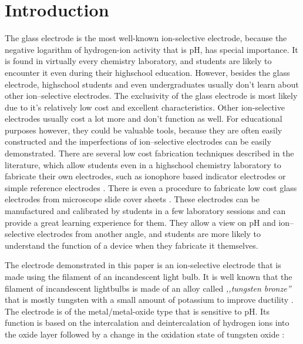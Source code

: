 \documentclass[manuscript=article, journal=jceda8]{achemso}
\begin{document}
\section{Introduction}

The glass electrode is the most well-known ion-selective electrode, because the negative logarithm of hydrogen-ion activity that is pH, has special importance. 
It is found in virtually every chemistry laboratory, and students are likely to encounter it even during their highschool education. However, besides the glass electrode, highschool students and even undergraduates usually don't learn about other ion--selective electrodes. 
The exclusivity of the glass electrode is most likely due to it's relatively low cost and excellent characteristics. Other ion-selective electrodes usually cost a lot more and don't function as well. For educational purposes however, they could be valuable tools, because they are often easily constructed and the imperfections of ion--selective electrodes can be easily demonstrated. There are several low cost fabrication techniques described in the literature, which allow students even in a highschool chemistry laboratory to fabricate their own electrodes, such as ionophore based indicator electrodes \cite{goldcamp2010inexpensive, marafie2007plastic} or simple reference electrodes \cite{riyazuddin1994low}. There is even a procedure to fabricate low cost glass electrodes from microscope slide cover sheets \cite{yong2019simple}. These electrodes can be manufactured and calibrated by students in a few laboratory sessions and can provide a great learning experience for them. They allow a view on pH and ion--selective electrodes from another angle, and students are more likely to understand the function of a device when they fabricate it themselves.

The electrode demonstrated in this paper is an ion-selective electrode that is made using the filament of an incandescent light bulb. It is well known that the filament of incandescent lightbulbs is made of an alloy called \emph{,,tungsten bronze''} that is mostly tungsten with a small amount of potassium to improve ductility \cite{cisternas2015electrode, wechter1972use, schade2010100}. The electrode is of the metal/metal-oxide type that is sensitive to pH. Its function is based on the intercalation and deintercalation of hydrogen ions into the oxide layer followed by a change in the oxidation state of tungsten oxide \cite{fenster2008single}:
\end{document}
